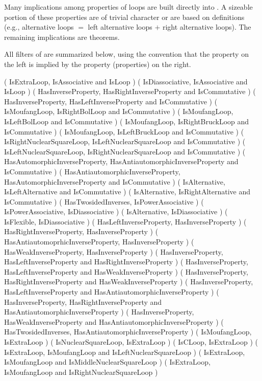 
Many implications among properties of loops are built directly into {\LOOPS}. A
sizeable portion of these properties are of trivial character or are based on
definitions (e.g., alternative loops $=$ left alternative loops $+$ right
alternative loops). The remaining implications are theorems.

All filters of {\LOOPS} are summarized below, using the {\GAP} convention that
the property on the left is implied by the property (properties) on the right.

\begintt
( IsExtraLoop,  IsAssociative and IsLoop )
( IsDiassociative, IsAssociative and IsLoop )
( HasInverseProperty, HasRightInverseProperty and IsCommutative )
( HasInverseProperty, HasLeftInverseProperty and IsCommutative )
( IsMoufangLoop, IsRightBolLoop and IsCommutative )
( IsMoufangLoop, IsLeftBolLoop and IsCommutative )
( IsMoufangLoop, IsRightBruckLoop and IsCommutative )
( IsMoufangLoop, IsLeftBruckLoop and IsCommutative )
( IsRightNuclearSquareLoop, IsLeftNuclearSquareLoop and IsCommutative )
( IsLeftNuclearSquareLoop, IsRightNuclearSquareLoop and IsCommutative )
( HasAutomorphicInverseProperty, HasAntiautomorphicInverseProperty and IsCommutative )
( HasAntiautomorphicInverseProperty, HasAutomorphicInverseProperty and IsCommutative )
( IsAlternative, IsLeftAlternative and IsCommutative )
( IsAlternative, IsRightAlternative and IsCommutative )
( HasTwosidedInverses, IsPowerAssociative )
( IsPowerAssociative, IsDiassociative )
( IsAlternative, IsDiassociative )
( IsFlexible, IsDiassociative )
( HasLeftInverseProperty, HasInverseProperty )
( HasRightInverseProperty, HasInverseProperty )
( HasAntiautomoprhicInverseProperty, HasInverseProperty )
( HasWeakInverseProperty, HasInverseProperty )
( HasInverseProperty, HasLeftInverseProperty and HasRightInverseProperty )
( HasInverseProperty, HasLeftInverseProperty and HasWeakInverseProperty )
( HasInverseProperty, HasRightInverseProperty and HasWeakInverseProperty )
( HasInverseProperty, HasLeftInverseProperty and HasAntiautomorphicInverseProperty )
( HasInverseProperty, HasRightInverseProperty and HasAntiautomorphicInverseProperty )
( HasInverseProperty, HasWeakInverseProperty and HasAntiautomorphicInverseProperty )
( HasTwosidedInverses, HasAntiautomorphicInverseProperty )
( IsMoufangLoop, IsExtraLoop )
( IsNuclearSquareLoop, IsExtraLoop )
( IsCLoop, IsExtraLoop )
( IsExtraLoop, IsMoufangLoop and IsLeftNuclearSquareLoop )
( IsExtraLoop, IsMoufangLoop and IsMiddleNuclearSquareLoop )
( IsExtraLoop, IsMoufangLoop and IsRightNuclearSquareLoop )
